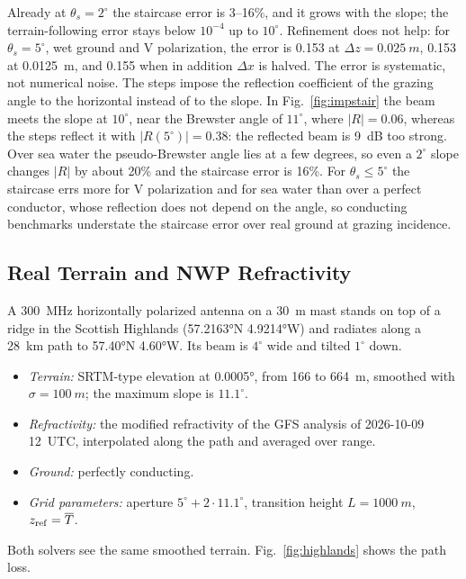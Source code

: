 \documentclass[journal]{IEEEtran}
\begin{document}
Already at $\theta_s=2^\circ$ the staircase error is 3--16\%, and it grows
with the slope; the terrain-following error stays below
$10^{-4}$ up to $10^\circ$. Refinement does not help: for $\theta_s=5^\circ$,
wet ground and V polarization, the error is 0.153 at $\Delta z=\SI{0.025}{m}$,
0.153 at \SI{0.0125}{m}, and 0.155 when in addition $\Delta x$ is halved. The
error is systematic, not numerical noise. The steps impose the reflection
coefficient of the grazing angle to the horizontal instead of to the slope. In
Fig.~\ref{fig:impstair} the beam meets the slope at $10^\circ$, near the
Brewster angle of $11^\circ$, where $|R|=0.06$, whereas the steps reflect it
with $|R(5^\circ)|=0.38$: the reflected beam is \SI{9}{dB} too strong. Over sea
water the pseudo-Brewster angle lies at a few degrees, so even a $2^\circ$
slope changes $|R|$ by about 20\% and the staircase error is 16\%. For
$\theta_s\le5^\circ$ the staircase errs more for V polarization and for sea
water than over a perfect conductor, whose reflection does not depend on the
angle, so conducting benchmarks understate the staircase error over real
ground at grazing incidence.

\subsection{Real Terrain and NWP Refractivity}\label{sec:highlands}

A \SI{300}{MHz} horizontally polarized antenna on a \SI{30}{m} mast stands on
top of a ridge in the Scottish Highlands (\ang{57.2163}N \ang{4.9214}W) and
radiates along a \SI{28}{km} path to \ang{57.40}N \ang{4.60}W. Its beam is
$4^\circ$ wide and tilted $1^\circ$ down.
\begin{itemize}
\item \emph{Terrain:} SRTM-type elevation at \ang{0.0005}, from 166 to \SI{664}{m},
smoothed with $\sigma=\SI{100}{m}$; the maximum slope is $11.1^\circ$.
\item \emph{Refractivity:} the modified refractivity of the GFS analysis of
2026-10-09 12~UTC, interpolated along the path and averaged over range.
\item \emph{Ground:} perfectly conducting.
\item \emph{Grid parameters:} aperture $5^\circ+2\cdot11.1^\circ$, transition
height $L=\SI{1000}{m}$, $z_{\rm ref}=\overline T$.
\end{itemize}
Both solvers see the same smoothed terrain. Fig.~\ref{fig:highlands} shows the
path loss.
\end{document}
